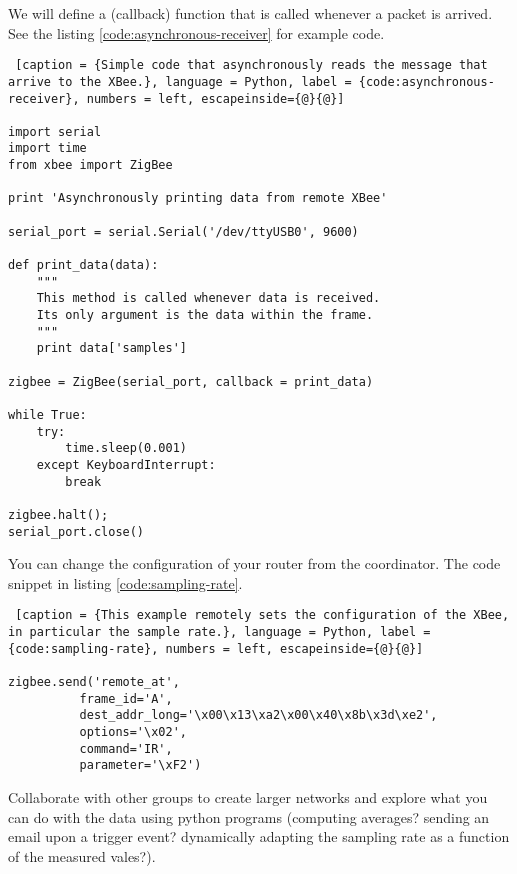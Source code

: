 We will define a (callback) function that is called whenever a packet is arrived.
See the listing \ref{code:asynchronous-receiver} for example code.

\begin{lstlisting} [caption = {Simple code that asynchronously reads the message that arrive to the XBee.}, language = Python, label = {code:asynchronous-receiver}, numbers = left, escapeinside={@}{@}]

import serial
import time
from xbee import ZigBee

print 'Asynchronously printing data from remote XBee'

serial_port = serial.Serial('/dev/ttyUSB0', 9600)

def print_data(data):
    """
    This method is called whenever data is received.
    Its only argument is the data within the frame.
    """
    print data['samples']

zigbee = ZigBee(serial_port, callback = print_data)

while True:
    try:
        time.sleep(0.001)
    except KeyboardInterrupt:
        break

zigbee.halt();
serial_port.close()

\end{lstlisting}

You can change the configuration of your router from the coordinator. 
The code snippet in listing \ref{code:sampling-rate}.

\begin{lstlisting} [caption = {This example remotely sets the configuration of the XBee, in particular the sample rate.}, language = Python, label = {code:sampling-rate}, numbers = left, escapeinside={@}{@}]

zigbee.send('remote_at',
          frame_id='A',
          dest_addr_long='\x00\x13\xa2\x00\x40\x8b\x3d\xe2',
          options='\x02',
          command='IR',
          parameter='\xF2')

\end{lstlisting}

Collaborate with other groups to create larger networks and explore what you can do with the data using python programs (computing averages? sending an email upon a trigger event? dynamically adapting the sampling rate as a function of the measured vales?).

